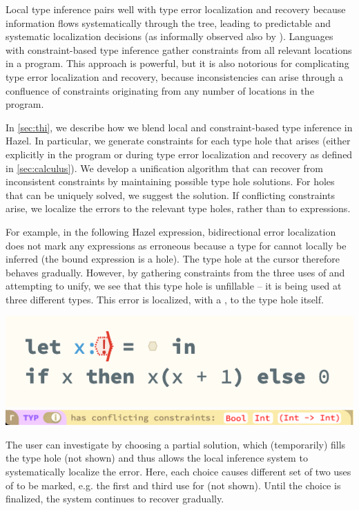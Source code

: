 Local type inference pairs well with type error localization and recovery because information flows systematically through the tree, leading to predictable and systematic localization decisions (as informally observed also by \cite{Localinf}). Languages with constraint-based type inference gather constraints from all relevant locations in a program. This approach is powerful, but it is also notorious for complicating type error localization and recovery, because inconsistencies can arise through a confluence of constraints originating from any number of locations in the program. 

In \cref{sec:thi}, we describe how we blend local and constraint-based type inference in Hazel. In particular,  
we generate constraints for each type hole that arises (either explicitly in the program or during type error localization and recovery as defined in \cref{sec:calculus}). 
We develop a unification algorithm that can recover from inconsistent constraints by maintaining possible type hole solutions. For holes that can be uniquely solved, we suggest the solution. 
If conflicting constraints arise, we localize the errors to the relevant type holes, rather 
than to expressions. 


For example, in the following Hazel expression, bidirectional error localization 
does not mark any expressions as erroneous because a type for  cannot locally be inferred (the bound expression is a hole). The type hole at the cursor therefore behaves gradually. 
However, by gathering constraints from the three uses of  and attempting to unify, we see that this type hole is unfillable -- it is being used at three different types. This error is localized, with a \li{!}, to the type hole itself.
\begin{center}
\vspace{-3px}
    \includegraphics[scale=0.55]{images/intro-thi.png}
    \includegraphics[scale=0.4]{images/example_CI.png}
\end{center}
The user can investigate by choosing a partial solution, which (temporarily) fills the type hole (not shown) and thus allows the local inference system to systematically localize the error.
Here, each choice causes different set of two uses of  to be marked, e.g. the first and third use for  (not shown). Until the choice is finalized, the system continues to recover gradually.
